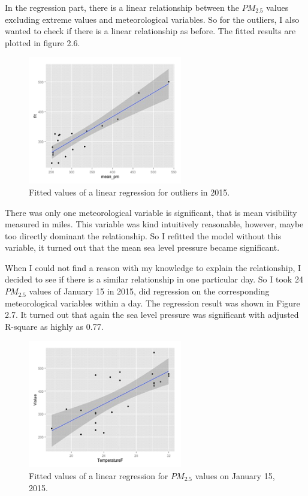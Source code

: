 \documentclass[11pt]{article} %
\begin{document}
In the regression part, there is a linear relationship between the \(PM_{2.5}\) values excluding extreme values and meteorological variables. So for the outliers, I also wanted to check if there is a linear relationship as before. The fitted results are plotted in figure 2.6.

 \begin{figure}[!ht]
  \centering
    \includegraphics[width=0.6\textwidth]{Figure2-6}
       \caption{Fitted values of a linear regression for outliers in 2015.}
\end{figure}

There was only one meteorological variable is significant, that is mean visibility measured in miles. This variable was kind intuitively reasonable, however, maybe too directly dominant the relationship. So I refitted the model without this variable, it turned out that the mean sea level pressure became significant.

When I could not find a reason with my knowledge to explain the relationship, I decided to see if there is a similar relationship in one particular day. So I took 24  \(PM_{2.5}\) values of January 15 in 2015, did regression on the corresponding meteorological variables within a day. The regression result was shown in Figure 2.7. It turned out that again the sea level pressure was significant with adjusted R-square as highly as 0.77.


 \begin{figure}[!ht]
  \centering
    \includegraphics[width=0.6\textwidth]{Figure2-7}
      \caption{Fitted values of a linear regression for \(PM_{2.5}\) values on January 15, 2015.}
\end{figure}
\end{document}
